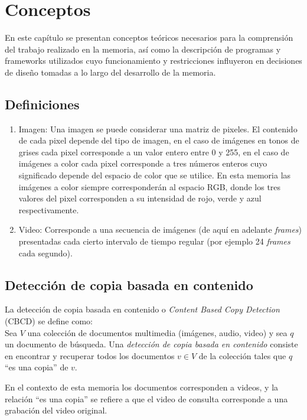 \chapter{Conceptos}\label{conceptos}

En este capítulo se presentan conceptos teóricos necesarios para la comprensión del trabajo realizado en la memoria, así como la descripción de  programas y frameworks utilizados cuyo funcionamiento y restricciones influyeron en decisiones de diseño tomadas a lo largo del desarrollo de la memoria.

\section{Definiciones}\label{definiciones}
\begin{enumerate}
\item Imagen: Una imagen se puede considerar una matriz de pixeles. El contenido de cada pixel depende del tipo de imagen, en el caso de imágenes en tonos de grises cada pixel corresponde a un valor entero entre 0 y 255, en el caso de imágenes a color cada pixel corresponde a tres números enteros cuyo significado depende del espacio de color que se utilice. En esta memoria las imágenes a color siempre corresponderán al espacio RGB, donde los tres valores del pixel corresponden a su intensidad de rojo, verde y azul respectivamente.

\item Video: Corresponde a una secuencia de imágenes (de aquí en adelante \textit{frames}) presentadas cada cierto intervalo de tiempo regular (por ejemplo 24 \textit{frames} cada segundo). 
\end{enumerate}


\section{Detección de copia basada en contenido}\label{copias}

La detección de copia basada en contenido o \emph{Content Based Copy Detection} (CBCD) se define como: \\
Sea $V$ una colección de documentos multimedia (imágenes, audio, video) y sea $q$ un documento de búsqueda. Una \emph{detección de copia basada en contenido} consiste en encontrar y recuperar todos los documentos $v \in V$ de la colección tales que $q$ ``es una copia'' de $v$.

En el contexto de esta memoria los documentos corresponden a videos, y la relación ``es una copia'' se refiere a que el video de consulta corresponde a una grabación del video original.

